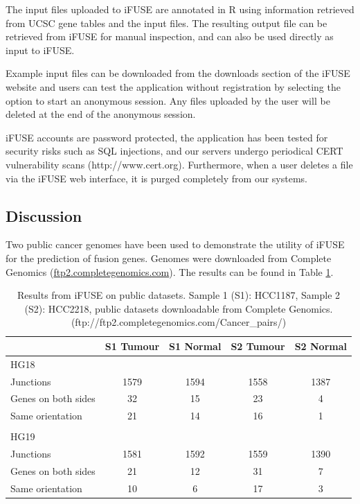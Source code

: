 The input files uploaded to iFUSE are annotated in R using information retrieved from UCSC gene tables and the input files. The resulting output file can be retrieved from iFUSE for manual inspection, and can also be used directly as input to iFUSE.

Example input files can be downloaded from the downloads section of the iFUSE website and users can test the application without registration by selecting the option to start an anonymous session. Any files uploaded by the user will be deleted at the end of the anonymous session.

iFUSE accounts are password protected, the application has been tested for security risks such as SQL injections, and our servers undergo periodical CERT vulnerability scans (http://www.cert.org). Furthermore, when a user deletes a file via the iFUSE web interface, it is purged completely from our systems.

\subsection*{Discussion}


Two public cancer genomes have been used to demonstrate the utility of iFUSE for the prediction of fusion genes. Genomes were downloaded from Complete Genomics (\href{ftp2.completegenomics.com}{ftp2.completegenomics.com}). The results can be found in Table \ref{tab:results}.


\begin{table}[!t]
    \begin{tabular}{lcccc}
        \toprule
                              & S1 Tumour  & S1 Normal  & S2 Tumour   & S2 Normal \\
        \midrule
        HG18                  &            &            &             &         \\
        Junctions             & 1579       & 1594       & 1558        & 1387    \\
        Genes on both sides   & 32         & 15         & 23          & 4       \\
        Same orientation      & 21         & 14         & 16          & 1       \\
                              &            &            &             &         \\
        HG19                  &            &            &             &         \\
        Junctions             & 1581       & 1592       & 1559        & 1390    \\
        Genes on both sides   & 21         & 12         & 31          & 7       \\
        Same orientation      & 10         & 6          & 17          & 3       \\
        \toprule
    \end{tabular}
    \caption{Results from iFUSE on public datasets. Sample 1 (S1): HCC1187, Sample 2 (S2): HCC2218, public datasets downloadable from Complete Genomics. (ftp://ftp2.completegenomics.com/Cancer\_pairs/)
    }
    \label{tab:results}
\end{table}

